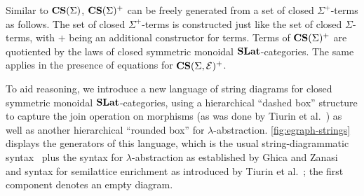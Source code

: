 Similar to $\mathbf{CS}(\Sigma)$, $\mathbf{CS}(\Sigma)^{+}$ can be freely generated from a set of closed $\Sigma^{+}$-terms as follows.
The set of closed $\Sigma^{+}$-terms is constructed just like the set of closed $\Sigma$-terms, with $+$ being an additional constructor for terms.
Terms of $\mathbf{CS}(\Sigma)^{+}$ are quotiented by the laws of closed symmetric monoidal $\mathbf{SLat}$-categories.
The same applies in the presence of equations for $\mathbf{CS}(\Sigma,\mathcal{E})^{+}$.

To aid reasoning, we introduce a new language of string diagrams for closed symmetric monoidal $\mathbf{SLat}$-categories, using a hierarchical \enquote{dashed box} structure to capture the join operation on morphisms (as was done by Tiurin et al.~\cite{tiurin2025equivalencehypergraphsdporewriting}) as well as another hierarchical \enquote{rounded box} for $\lambda$-abstraction.
\autoref{fig:egraph-strings} displays the generators of this language, which is the usual string-diagrammatic syntax~\cite{Selinger_2010} plus the syntax for $\lambda$-abstraction as established by Ghica and Zanasi~\cite{ghica2024stringdiagramslambdacalculifunctional} and syntax for semilattice enrichment as introduced by Tiurin et al.~\cite{tiurin2025equivalencehypergraphsdporewriting}; the first component denotes an empty diagram.




